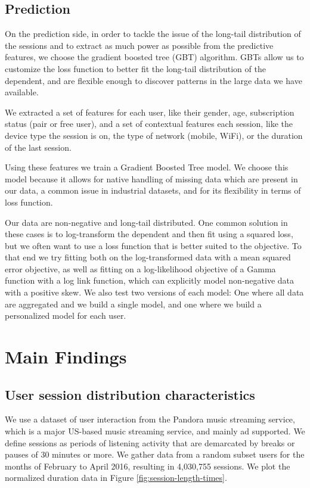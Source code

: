 \subsection{Prediction}

On the prediction side, in order to tackle the issue of the long-tail distribution
of the sessions and to extract as much power as possible from the predictive features,
we choose the gradient boosted tree (GBT) algorithm. GBTs allow us to customize the
loss function to better fit the long-tail distribution of the dependent, and are flexible
enough to discover patterns in the large data we have available.

We extracted a set of features for each user, like their gender, age, subscription
status (pair or free user), and a set of contextual features each session,
like the device type the session is on, the type of network (mobile, WiFi), or
the duration of the last session.

Using these features we train a Gradient Boosted Tree model. We choose this model
because it allows for native handling of missing data which are present in our
data, a common issue in industrial datasets, and for its flexibility in terms of
loss function.

Our data are non-negative and long-tail distributed. One common solution in
these cases is to log-transform the dependent and then fit using a squared
loss, but we often want to use a loss function that is better suited to the
objective. To that end we try fitting both on the log-transformed data with
a mean squared error objective, as well as fitting on a log-likelihood
objective of a Gamma function with a log link function, which can explicitly
model non-negative data with a positive skew. We also test two versions
of each model: One where all data are aggregated and we build a single model,
and one where we build a personalized model for each user.


\section{Main Findings}
\label{sec:session-length-main-findings}

\subsection{User session distribution characteristics}

We use a dataset of user interaction from the Pandora music streaming service, which
is a major US-based music streaming service, and mainly ad supported. We define
sessions as periods of listening activity that are demarcated by breaks or pauses of
30 minutes or more.
We gather data from a random subset users for the months of February to April 2016,
resulting in 4,030,755 sessions. We plot the normalized duration data in Figure
\ref{fig:session-length-times}.


